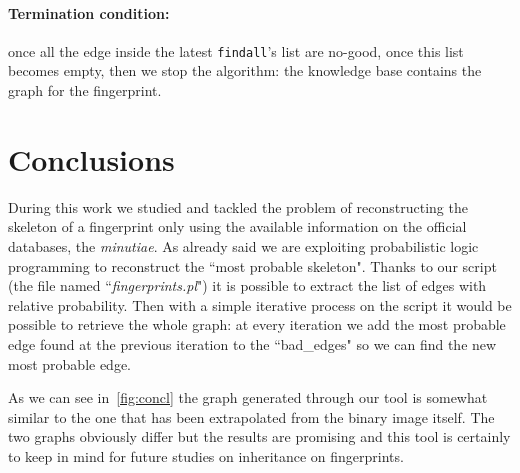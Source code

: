 \documentclass[8pt]{article}
\begin{document}
\paragraph{Termination condition:} once all the edge inside
the latest \texttt{findall}'s list are no-good, \ie once this list becomes empty,
then we stop the algorithm: the knowledge base contains the graph for the
fingerprint.

\section{Conclusions}
During this work we studied and tackled the problem of reconstructing the skeleton 
of a fingerprint only using the available information on the official databases, 
\ie the \emph{minutiae}.
As already said we are exploiting probabilistic logic programming to reconstruct the 
\textquotedblleft most probable skeleton".
Thanks to our script (the file named \textquotedblleft \textit{fingerprints.pl}") it 
is possible to extract the list of edges with relative probability. 
Then with a simple iterative process on the script it would be possible to retrieve 
the whole graph: at every iteration we add the most probable edge found at the previous 
iteration to the \textquotedblleft bad\_edges" so we can find the new most probable edge.

As we can see in~\cref{fig:concl} the graph generated through our tool is somewhat similar 
to the one that has been extrapolated from the binary image itself. 
The two graphs obviously differ but the results are promising and this tool is certainly 
to keep in mind for future studies on inheritance on fingerprints.
\end{document}

